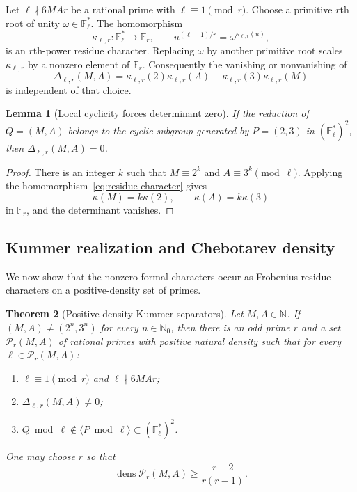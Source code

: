 \documentclass[11pt,oneside]{article}
\newtheorem{theorem}{Theorem}[section]
\newtheorem{lemma}[theorem]{Lemma}
\theoremstyle{definition}
\theoremstyle{remark}
\newcommand{\N}{\mathbb N}
\newcommand{\Nzero}{\mathbb N_0}
\newcommand{\F}{\mathbb F}
\newcommand{\dens}{\operatorname{dens}}
\begin{document}
Let $\ell\nmid6MAr$ be a rational prime with $\ell\equiv1\pmod r$.  Choose a primitive
$r$th root of unity $\omega\in\F_\ell^*$.  The homomorphism
\begin{equation}
 \kappa_{\ell,r}:\F_\ell^*\longrightarrow\F_r,
 \qquad
 u^{(\ell-1)/r}=\omega^{\kappa_{\ell,r}(u)},
 \label{eq:residue-character}
\end{equation}
is an $r$th-power residue character.  Replacing $\omega$ by another primitive root scales
$\kappa_{\ell,r}$ by a nonzero element of $\F_r$.  Consequently the vanishing or nonvanishing
of
\begin{equation}
 \Delta_{\ell,r}(M,A)=
 \kappa_{\ell,r}(2)\kappa_{\ell,r}(A)
 -\kappa_{\ell,r}(3)\kappa_{\ell,r}(M)
 \label{eq:actual-kummer-det}
\end{equation}
is independent of that choice.

\begin{lemma}[Local cyclicity forces determinant zero]
\label{lem:local-cyclic-zero}
If the reduction of $Q=(M,A)$ belongs to the cyclic subgroup generated by
$P=(2,3)$ in $(\F_\ell^*)^2$, then $\Delta_{\ell,r}(M,A)=0$.
\end{lemma}

\begin{proof}
There is an integer $k$ such that $M\equiv2^k$ and $A\equiv3^k\pmod\ell$.  Applying the
homomorphism~\eqref{eq:residue-character} gives
\[
 \kappa(M)=k\kappa(2),\qquad \kappa(A)=k\kappa(3)
\]
in $\F_r$, and the determinant vanishes.
\end{proof}

\subsection{Kummer realization and Chebotarev density}

We now show that the nonzero formal characters occur as Frobenius residue characters on a
positive-density set of primes.

\begin{theorem}[Positive-density Kummer separators]
\label{thm:kummer-separators}
Let $M,A\in\N$.  If $(M,A)\ne(2^n,3^n)$ for every $n\in\Nzero$, then there is an odd prime
$r$ and a set $\mathcal P_r(M,A)$ of rational primes with positive natural density such that
for every $\ell\in\mathcal P_r(M,A)$:
\begin{enumerate}
\item $\ell\equiv1\pmod r$ and $\ell\nmid6MAr$;
\item $\Delta_{\ell,r}(M,A)\ne0$;
\item $Q\bmod\ell\notin\langle P\bmod\ell\rangle\subset(\F_\ell^*)^2$.
\end{enumerate}
One may choose $r$ so that
\begin{equation}
 \dens\mathcal P_r(M,A)\ge\frac{r-2}{r(r-1)}.
 \label{eq:density-lower}
\end{equation}
\end{theorem}
\end{document}
